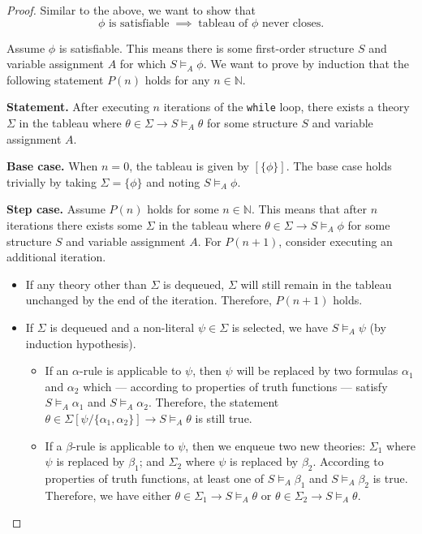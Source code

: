 \begin{proof}
    Similar to the above, we want to show that 
    \[\phi \text{ is satisfiable} \;\implies\; \text{tableau of } \phi \text{ never closes.}\]

    Assume \(\phi\) is satisfiable. This means there is some first-order structure \(S\) and variable assignment \(A\) for which \(S \models_A \phi\). We want to prove by induction that the following statement \(P(n)\) holds for any \(n \in \mathbb{N}\).

    \textbf{Statement.} After executing \(n\) iterations of the \texttt{while} loop, there exists a theory \(\Sigma\) in the tableau where \(\theta \in \Sigma \rightarrow S \models_A \theta\) for some structure \(S\) and variable assignment \(A\).

    \textbf{Base case.} When \(n = 0\), the tableau is given by \([\{\phi\}]\). The base case holds trivially by taking \(\Sigma = \{\phi\}\) and noting \(S \models_A \phi\).

    \textbf{Step case.} Assume \(P(n)\) holds for some \(n \in \mathbb{N}\). This means that after \(n\) iterations there exists some \(\Sigma\) in the tableau where \(\theta \in \Sigma \rightarrow S \models_A \phi\) for some structure \(S\) and variable assignment \(A\). For \(P(n+1)\), consider executing an additional iteration.
    \begin{itemize}
        \item If any theory other than \(\Sigma\) is dequeued, \(\Sigma\) will still remain in the tableau unchanged by the end of the iteration. Therefore, \(P(n + 1)\) holds.
        \item If \(\Sigma\) is dequeued and a non-literal \(\psi \in \Sigma\) is selected, we have \(S \models_A \psi\) (by induction hypothesis).
        
        \begin{itemize}
            \item If an \(\alpha\)-rule is applicable to \(\psi\), then \(\psi\) will be replaced by two formulas \(\alpha_1\) and \(\alpha_2\) which --- according to properties of truth functions --- satisfy \(S \models_A \alpha_1\) and \(S \models_A \alpha_2\). Therefore, the statement \(\theta \in \Sigma[\psi/\{\alpha_1, \alpha_2\}] \rightarrow S \models_A \theta\) is still true.
            
            \item If a \(\beta\)-rule is applicable to \(\psi\), then we enqueue two new theories: \(\Sigma_1\) where \(\psi\) is replaced by \(\beta_1\); and \(\Sigma_2\) where \(\psi\) is replaced by \(\beta_2\). According to properties of truth functions, at least one of \(S \models_A \beta_1\) and \(S \models_A \beta_2\) is true. Therefore, we have either \(\theta \in \Sigma_1 \rightarrow S \models_A \theta\) or \(\theta \in \Sigma_2 \rightarrow S \models_A \theta\).
            

\end{itemize}
\end{itemize}
\end{proof}
